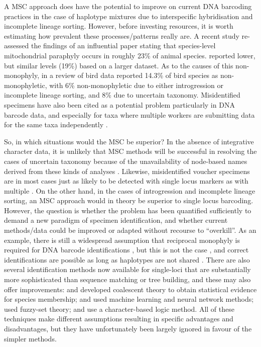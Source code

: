 \documentclass[12pt]{article}
\begin{document}
A MSC approach does have the potential to improve on current DNA barcoding practices in the case of haplotype mixtures due to interspecific hybridisation and incomplete lineage sorting. However, before investing resources, it is worth estimating how prevalent these processes/patterns really are. A recent study \citep{Ross2014} re-assessed the findings of an influential paper \citep{Funk2003} stating that species-level mitochondrial paraphyly occurs in roughly 23\% of animal species. \citeauthor{Ross2014} reported lower, but similar levels (19\%) based on a larger dataset. As to the causes of this non-monophyly, in a review of bird data \citep{McKay2010} reported 14.3\% of bird species as non-monophyletic, with 6\% non-monophyletic due to either introgression or incomplete lineage sorting, and 8\% due to uncertain taxonomy. Misidentified specimens have also been cited as a potential problem particularly in DNA barcode data, and especially for taxa where multiple workers are submitting data for the same taxa independently \citep{Collins2012}. 

So, in which situations would the MSC be superior? In the absence of integrative character data, it is unlikely that MSC methods will be successful in resolving the cases of uncertain taxonomy because of the unavailability of node-based names derived from these kinds of analyses \citep{Bauer2010}. Likewise, misidentified voucher specimens are in most cases just as likely to be detected with single locus markers as with multiple \citep{Becker2011,Ko2013}. On the other hand, in the cases of introgression and incomplete lineage sorting, an MSC approach would in theory be superior to single locus barcoding. However, the question is whether the problem has been quantified sufficiently to demand a new paradigm of specimen identification, and whether current methods/data could be improved or adapted without recourse to ``overkill''. As an example, there is still a widespread assumption that reciprocal monophyly is required for DNA barcode identifications \citep{Goldstein2011}, but this is not the case \citep{Meier2008}, and correct identifications are possible as long as haplotypes are not shared \citep{Meier2006}. There are also several identification methods now available for single-loci that are substantially more sophisticated than sequence matching or tree building, and these may also offer improvements: \citep{Nielsen2006} and \citep{Abdo2007} developed coalescent theory to obtain statistical evidence for species membership; \citep{Zhang2008} and \citep{Zhang2012b} used machine learning and neural network methods; \citep{Zhang2012a} used fuzzy-set theory; and \citep{Weitschek2013} use a character-based logic method. All of these techniques make different assumptions resulting in specific advantages and disadvantages, but they have unfortunately been largely ignored in favour of the simpler methods.
\end{document}
